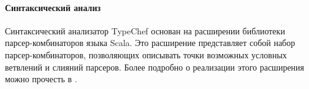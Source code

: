 \paragraph{Синтаксический анализ}

Синтаксический анализатор TypeChef основан на расширении библиотеки парсер-комбинаторов языка Scala. Это расширение представляет собой набор парсер-комбинаторов, позволяющих описывать точки возможных условных ветвлений и слияний парсеров. Более подробно о реализации этого расширения можно прочесть в \cite{typechef2}.


